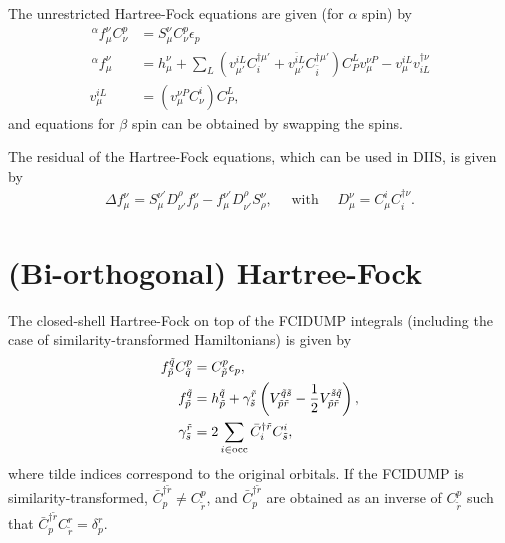 \documentclass[a4paper,12pt,oneside]{book}
\newcommand{\half}{\frac{1}{2}}
\newcommand{\spa}[1]{{#1}}
\newcommand{\spb}[1]{\bar{#1}}
\newcommand{\dg}{\dagger}
\newcommand{\pre}[1]{\,#1\!}
\begin{document}
The unrestricted Hartree-Fock equations are given (for $\alpha$ spin) by
\begin{equation}
\begin{aligned}
\pre{^\alpha}f_{\mu}^{\nu} C_{\nu}^{\spa p} &= S_{\mu}^{\nu} C_{\nu}^{\spa p} \epsilon_{\spa p}\\
\pre{^\alpha}f_{\mu}^{\nu} &= h_{\mu}^{\nu} + \sum_L\left(v_{\mu'}^{\spa i L} C^{\dagger\mu'}_{\spa i}
+v_{\mu'}^{\spb i L} C^{\dagger\mu'}_{\spb i}\right) C_{P}^{L} v_{\mu}^{\nu P}
- v_{\mu}^{\spa i L} v^{\dagger\nu}_{\spa i L}\\
v_{\mu}^{\spa i L} &= \left(v_{\mu}^{\nu P} C_{\nu}^{\spa i}\right) C_{P}^L,
\end{aligned}
\end{equation}
and equations for $\beta$ spin can be obtained by swapping the spins.

The residual of the Hartree-Fock equations, which can be used in DIIS, is given by 
\begin{equation}
\begin{aligned}
  \label{eq:hf-residual}
  \Delta f_{\mu}^{\nu} = S_{\mu}^{\nu'} D_{\nu'}^{\rho}f_{\rho}^{\nu} - f_{\mu}^{\nu'} D_{\nu'}^{\rho}S_{\rho}^{\nu},
  \quad \mbox{ with } \quad D_{\mu}^{\nu} = C_{\mu}^i C_i^{\dagger\nu}.
\end{aligned}
\end{equation}

\section{(Bi-orthogonal) Hartree-Fock}
The closed-shell Hartree-Fock on top of the FCIDUMP integrals (including the case of similarity-transformed 
Hamiltonians) is given by
\begin{equation}
\begin{aligned}
f_{\tilde p}^{\tilde q} C_{\tilde q}^p &= C_{\tilde p}^p \epsilon_p,\\
f_{\tilde p}^{\tilde q} &= h_{\tilde p}^{\tilde q} + 
\gamma^{\tilde r}_{\tilde s} \left(V_{\tilde p\tilde r}^{\tilde q\tilde s} 
- \half V_{\tilde p\tilde r}^{\tilde s\tilde q}\right),\\
  \gamma^{\tilde r}_{\tilde s} &= 2\sum_{i \in \rm occ} \bar C^{\dg \tilde r}_{i} C_{\tilde s}^i,
\end{aligned}
\end{equation}
where tilde indices correspond to the original orbitals.
If the FCIDUMP is similarity-transformed, $\bar C^{\dg \tilde r}_{p} \neq C_{\tilde r}^p$,
and $\bar C^{\dg \tilde r}_{p}$ are obtained as an inverse of $C_{\tilde r}^p$ such that
$\bar C^{\dg \tilde r}_{p} C_{\tilde r}^r = \delta^{r}_{p}$.
\end{document}
